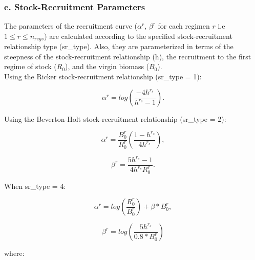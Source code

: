 \documentclass{article}
\begin{document}
\hfill

\subsubsection{e. Stock-Recruitment Parameters}

The parameters of the recruitment curve ($\alpha^r$, $\beta^r$ for each regimen $r$ i.e $1\leq r \leq n_{regs}$) are calculated according to the specified stock-recruitment relationship type (sr\_type). Also, they are parameterized in terms of the steepness of the stock-recruitment relationship (h), the recruitment to the first regime of stock ($R_0$), and the virgin biomass ($B_0$).\\

Using the Ricker stock-recruitment relationship (sr\_type = 1):

\begin{equation}
\alpha^r = log\left(\dfrac{-4h^{r_s}}{h^{r_s}-1}\right).
\end{equation}

Using the Beverton-Holt stock-recruitment relationship (sr\_type = 2):

\begin{equation}
\alpha^r = \dfrac{B^{r}_0}{R^{r}_0}\left(\dfrac{1 - h^{r_s}}{4h^{r_s}}\right),  
\end{equation}

\begin{equation}
\beta^r = \dfrac{5h^{r_s}-1}{4h^{r_s}R^{r}_0}.
\end{equation}

When sr\_type = 4:

\begin{equation}
\alpha^r = log\left(\dfrac{R^{r}_0}{B^{r}_0}\right)+\beta*B^{r}_0, 
\end{equation}

\begin{equation}
\beta^r = log\left(\dfrac{5h^{r_s}}{0.8*B^{r}_0}\right)
\end{equation}

where:
\end{document}
